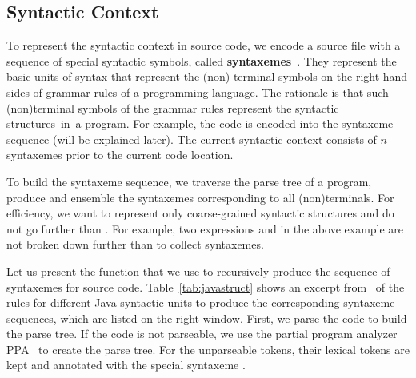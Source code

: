 \subsection{Syntactic Context}
\label{syntaxsec}




 To represent the syntactic context in source
code, we encode a source file with a sequence of special syntactic
symbols, called {\bf syntaxemes}~\cite{ase15}.
They represent the basic units of syntax that represent the (non)-terminal
symbols on the right hand sides of grammar rules of a programming
language. The rationale is that such (non)terminal symbols of the
grammar rules represent the syntactic structures~in~a program. For
example, the code  is
encoded into the syntaxeme sequence  (will be explained later). The current syntactic
context consists of $n$ syntaxemes prior to the current code location.

To build the syntaxeme sequence, we traverse the parse tree of a
program, produce and ensemble the syntaxemes corresponding to all
(non)terminals. For efficiency, we want to represent only
coarse-grained syntactic structures and do not go further than
.  For example, two expressions  and
 in the above example are not broken down further than
 to collect syntaxemes.

\vspace{0.05in}
  Let us present the function {\bf
  } that we use to recursively produce the sequence of
syntaxemes for source code. Table~\ref{tab:javastruct} shows an
excerpt from~\cite{ase15} of the rules for different Java syntactic
units to produce the corresponding syntaxeme sequences, which are
listed on the right window.
First, we parse the code to build the parse tree.
If the code is not parseable, we use the partial program analyzer 
PPA~\cite{ppa08} to create the parse tree.
For the unparseable tokens, their lexical tokens are kept and
annotated with the special syntaxeme .
%


